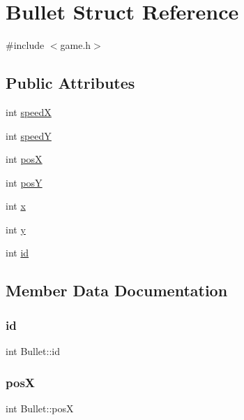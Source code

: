 \hypertarget{struct_bullet}{}\section{Bullet Struct Reference}
\label{struct_bullet}


{\ttfamily \#include $<$game.\+h$>$}

\subsection*{Public Attributes}
\begin{DoxyCompactItemize}
\item 
int \mbox{\hyperlink{struct_bullet_a82599c14ed9a73741bc856d476176da3}{speedX}}
\item 
int \mbox{\hyperlink{struct_bullet_a26093711aaa5ded2d5665ee5132672d8}{speedY}}
\item 
int \mbox{\hyperlink{struct_bullet_aaff8e7a3adc6d7a6e774637bd33cd119}{posX}}
\item 
int \mbox{\hyperlink{struct_bullet_a644e6895da8de9104266f5258aeed8f6}{posY}}
\item 
int \mbox{\hyperlink{struct_bullet_add8da3ee8a3265a38ebbfe8a254ebb19}{x}}
\item 
int \mbox{\hyperlink{struct_bullet_a524e0ee515b1418341cdd8f8dffce1ee}{y}}
\item 
int \mbox{\hyperlink{struct_bullet_a0a9eaf4c15d27ab4354a242503ddd0af}{id}}
\end{DoxyCompactItemize}


\subsection{Member Data Documentation}
\mbox{\label{struct_bullet_a0a9eaf4c15d27ab4354a242503ddd0af}} 
\subsubsection{\texorpdfstring{id}{id}}
{\footnotesize\ttfamily int Bullet\+::id}

\mbox{\label{struct_bullet_aaff8e7a3adc6d7a6e774637bd33cd119}} 
\subsubsection{\texorpdfstring{posX}{posX}}
{\footnotesize\ttfamily int Bullet\+::posX}

